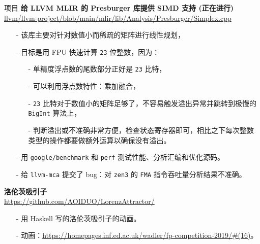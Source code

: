 \documentclass{resume} %
\newcommand{\itemsepval}{-6pt}
\newcommand{\code}{\texttt}
\begin{document}
\begin{rSection}{项目}
    \textbf{给 LLVM MLIR 的 Presburger 库提供 SIMD 支持 (正在进行)} \hfill \\
    \url{llvm/llvm-project/blob/main/mlir/lib/Analysis/Presburger/Simplex.cpp} \hfill \par
    \begin{itemize}
        \itemsep \itemsepval {} 
        \item[-] 该库主要对针对数值小而稀疏的矩阵进行线性规划，
        \item[-] 目标是用 FPU 快速计算 \code{23} 位整数，因为： 
        \begin{itemize}
            \itemsep \itemsepval {} 
            \item[-] 单精度浮点数的尾数部分正好是 \code{23} 比特，
            \item[-] 可以利用浮点数特性：乘加融合，
            \item[-] \code{23} 比特对于数值小的矩阵足够了，不容易触发溢出异常并跳转到极慢的 \code{BigInt} 算法上， 
            \item[-] 判断溢出或不准确非常方便，检查状态寄存器即可，相比之下每次整数类型的操作都要做额外运算以确保没有溢出。
        \end{itemize}
        \item[-] 用 \code{google/benchmark} 和 \code{perf} 测试性能、分析汇编和优化源码。 
        \item[-] 给 \code{llvm-mca} 提交了 bug：对 \code{zen3} 的 \code{FMA} 指令吞吐量分析结果不准确。 
    \end{itemize}

    
    \textbf{洛伦茨吸引子} \hfill \\
    \url{https://github.com/AOIDUO/LorenzAttractor/} \hfill \par
    \begin{itemize}
        \itemsep \itemsepval {} 
        \item[-] 用 Haskell 写的洛伦茨吸引子的动画。
        \item[-] 动画：\url{https://homepages.inf.ed.ac.uk/wadler/fp-competition-2019/#(16)}。
    \end{itemize}


\end{rSection}
\end{document}

